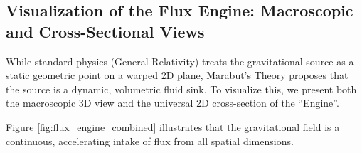 \documentclass[11pt, a4paper]{article}
\begin{document}
\subsection{Visualization of the Flux Engine: Macroscopic and Cross-Sectional Views}

While standard physics (General Relativity) treats the gravitational source as a static geometric point on a warped 2D plane, Marab\={u}t's Theory proposes that the source is a dynamic, volumetric fluid sink. To visualize this, we present both the macroscopic 3D view and the universal 2D cross-section of the ``Engine''.

Figure \ref{fig:flux_engine_combined} illustrates that the gravitational field is a continuous, accelerating intake of flux from all spatial dimensions.
\end{document}
